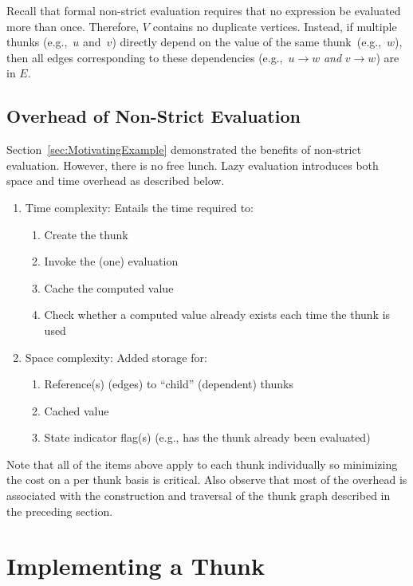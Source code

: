 \documentclass[11pt]{article}
\begin{document}
Recall that formal non-strict evaluation requires that no expression be evaluated more than once. Therefore, $V$ contains no duplicate vertices.  Instead, if multiple thunks (e.g.,~$u$ and~$v$) directly depend on the value of the same thunk~(e.g.,~$w$), then all edges corresponding to these dependencies (e.g.,~${u\rightarrow w}$ \textit{and} ${v\rightarrow w}$) are in $E$.

\subsection{Overhead of Non-Strict Evaluation}\label{sec:Overhead}

Section~\ref{sec:MotivatingExample} demonstrated the benefits of non-strict evaluation. However, there is no free lunch.  Lazy evaluation introduces both space and time overhead as described below.

\begin{enumerate}
  \item Time complexity: Entails the time required to:
  \begin{enumerate}
    \item Create the thunk
    \item \label{item:InvokeEvaluation} Invoke the (one) evaluation
    \item Cache the computed value
    \item Check whether a computed value already exists each time the thunk is used
  \end{enumerate}

  \item Space complexity: Added storage for:
  \begin{enumerate}
    \item Reference(s) (edges) to ``child'' (dependent) thunks
    \item Cached value
    \item State indicator flag(s) (e.g., has the thunk already been evaluated)
  \end{enumerate}
\end{enumerate}

\noindent
Note that all of the items above apply to each thunk individually so minimizing the cost on a per thunk basis is critical.  Also observe that most of the overhead is associated with the construction and traversal of the thunk graph described in the preceding section.

\section{Implementing a Thunk}\label{sec:RepresentingDelayedComputation}
\end{document}
